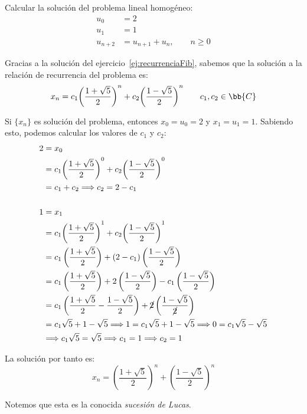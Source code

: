 \begin{ejercicio}
    Calcular la solución del problema lineal homogéneo:
    \begin{align*}
        u_0 &= 2 \\
        u_1 &= 1 \\
        u_{n+2} &= u_{n+1} + u_n,\qquad n\geq 0
    \end{align*}

    Gracias a la solución del ejercicio~\ref{ej:recurrenciaFib}, sabemos que la solución a la relación de recurrencia del problema es:
    \begin{equation*}
        x_n = c_1{\left(\dfrac{1+\sqrt{5}}{2}\right)}^n + c_2 {\left(\dfrac{1-\sqrt{5}}{2}\right)}^n
        \qquad c_1,c_2\in \bb{C}
    \end{equation*}

    Si $\{x_n\}$ es solución del problema, entonces $x_0 = u_0 = 2$ y $x_1 = u_1 = 1$. Sabiendo esto,
    podemos calcular los valores de $c_1$ y $c_2$:
    \begin{align*}
        2 &= x_0 \\
          &= c_1{\left(\dfrac{1+\sqrt{5}}{2}\right)}^0 + c_2 {\left(\dfrac{1-\sqrt{5}}{2}\right)}^0\\
          &= c_1 + c_2 \Longrightarrow c_2 = 2-c_1\\ \\
        1 &= x_1 \\
          &= c_1 {\left(\dfrac{1+\sqrt{5}}{2}\right)}^1 + c_2 {\left(\dfrac{1-\sqrt{5}}{2}\right)}^1 \\
          &= c_1 \left(\dfrac{1+\sqrt{5}}{2}\right) + (2- c_1) \left(\dfrac{1-\sqrt{5}}{2}\right) \\
          &= c_1 \left(\dfrac{1+\sqrt{5}}{2}\right) + 2 \left(\dfrac{1-\sqrt{5}}{2}\right)-c_1\left(\dfrac{1-\sqrt{5}}{2}\right) \\
          &= c_1 \left(\dfrac{1+\sqrt{5}}{2}-\dfrac{1-\sqrt{5}}{2}\right) + \cancel{2}\left(\dfrac{1-\sqrt{5}}{\cancel{2}}\right) \\
          &= c_1 \sqrt{5} +1 - \sqrt{5} 
          \Longrightarrow 1 = c_1 \sqrt{5} + 1 -\sqrt{5}
          \Longrightarrow 0 = c_1\sqrt{5}-\sqrt{5} \\
          &\Longrightarrow c_1\sqrt{5} = \sqrt{5} \Longrightarrow c_1 = 1 \Longrightarrow c_2 = 1
    \end{align*}

    La solución por tanto es:
    \begin{equation*}
        x_n = {\left(\dfrac{1+\sqrt{5}}{2}\right)}^n + {\left(\dfrac{1-\sqrt{5}}{2}\right)}^n
    \end{equation*}

    Notemos que esta es la conocida \emph{sucesión de Lucas}.
\end{ejercicio}


